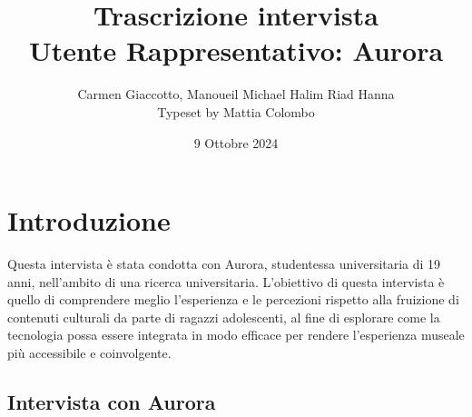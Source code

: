 \documentclass{article}
\title{\textbf{Trascrizione intervista}\\ Utente Rappresentativo: Aurora}
\author{Carmen Giaccotto, Manoueil Michael Halim Riad Hanna \\ Typeset by Mattia Colombo}
\date{9 Ottobre 2024}
\begin{document}
\maketitle

\section{Introduzione}
Questa intervista è stata condotta con Aurora, studentessa universitaria di 19 anni, nell'ambito di una ricerca universitaria. 
L’obiettivo di questa intervista è quello di comprendere meglio l'esperienza e le percezioni rispetto alla fruizione di contenuti culturali da parte di ragazzi adolescenti, al fine di esplorare come la tecnologia possa essere integrata in modo efficace per rendere l’esperienza museale più accessibile e coinvolgente.

\subsection{\textcolor{subsectioncolor}{Intervista con Aurora}}
\end{document}
